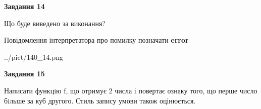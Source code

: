 \documentclass[11pt, ukrainian]{article}
\begin{document}
{\begin {large}
{\begin {center}\textbf{Завдання 14}\end {center}}\par
Що буде виведено за виконання? \par
Повідомлення інтерпретатора про помилку позначати \textbf{error}

\begin{center}
	{../pict/140_14.png}
\end{center}
\newpage

{\begin {center}\textbf{Завдання 15}\end {center}}\par

Написати функцiю f, що отримує 2 числа і повертає ознаку того, що перше число бiльше за куб другого. Стиль запису умови також оцінюється.\par
\newpage

\end {large}}
\end{document}
